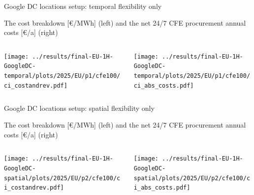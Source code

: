 \begin{frame}{Google DC locations setup: temporal flexibility only}

  \centering

  {\footnotesize
  The cost breakdown [\euro/MWh] (left) and the net 24/7 CFE procurement annual costs [\euro/a] (right)
  }
  \vspace{.5cm}
  
  \begin{columns}
    \begin{column}{8cm}
    \centering
    \texttt{[image: ../results/final-EU-1H-GoogleDC-temporal/plots/2025/EU/p1/cfe100/ci\_costandrev.pdf]}
    \end{column}
    
    \begin{column}{8cm}
      \centering
      \texttt{[image: ../results/final-EU-1H-GoogleDC-temporal/plots/2025/EU/p1/cfe100/ci\_abs\_costs.pdf]}
      \end{column}
    \end{columns}

\end{frame}


\begin{frame}{Google DC locations setup: spatial flexibility only}

  \centering

  {\footnotesize
  The cost breakdown [\euro/MWh] (left) and the net 24/7 CFE procurement annual costs [\euro/a] (right)
  }
  \vspace{.5cm}
  
  \begin{columns}
    \begin{column}{8cm}
    \centering
    \texttt{[image: ../results/final-EU-1H-GoogleDC-spatial/plots/2025/EU/p2/cfe100/ci\_costandrev.pdf]}
    \end{column}
    
    \begin{column}{8cm}
      \centering
      \texttt{[image: ../results/final-EU-1H-GoogleDC-spatial/plots/2025/EU/p2/cfe100/ci\_abs\_costs.pdf]}
      \end{column}
    \end{columns}

\end{frame}


